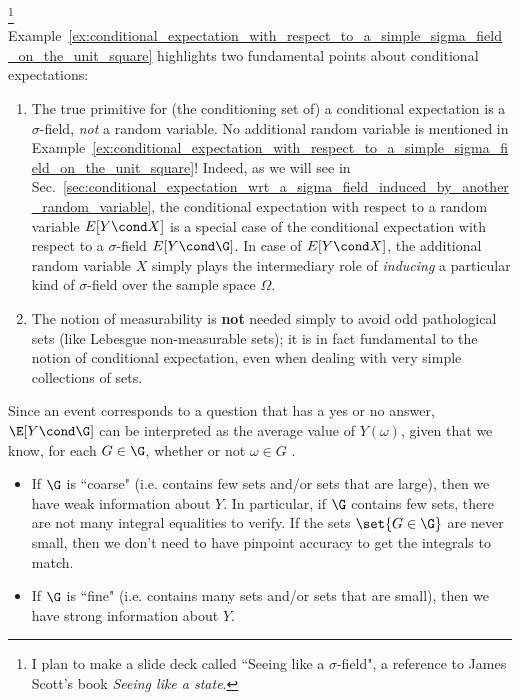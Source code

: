 \documentclass{article} %
\begin{document}
\begin{remark}\footnote{I plan to make a slide deck called ``Seeing like a $\sigma$-field", a reference to James Scott's book \textit{Seeing like a state}.} Example~\ref{ex:conditional_expectation_with_respect_to_a_simple_sigma_field_on_the_unit_square} highlights two fundamental points about conditional expectations:
\begin{enumerate}
\item The true primitive for (the conditioning set of) a conditional expectation is a $\sigma$-field, \textit{not} a random variable.  No additional random variable is mentioned in Example~\ref{ex:conditional_expectation_with_respect_to_a_simple_sigma_field_on_the_unit_square}!  Indeed, as we will see in Sec.~\ref{sec:conditional_expectation_wrt_a_sigma_field_induced_by_another_random_variable}, the conditional expectation with respect to a random variable $E[Y \cond X]$ is a special case of the conditional expectation with respect to a $\sigma$-field $E[Y \cond \G]$.  In case of $E[Y \cond X]$,  the additional random variable $X$ simply plays the intermediary role of \textit{inducing} a particular kind of $\sigma$-field over the sample space $\Omega$. 
\item The notion of measurability is \textbf{not} needed simply to avoid odd pathological sets (like Lebesgue non-measurable sets); it is in fact fundamental to the notion of conditional expectation, even when dealing with very simple collections of sets.
\end{enumerate}	
\end{remark}


\begin{remark}
Since an event corresponds to a question that has a yes or no answer, $\E[Y \cond \G]$ can be interpreted as the average value of $Y(\omega)$, given that we know, for each $G \in \G$, whether or not $\omega \in G$ \cite[pp.218]{ash2000probability}.  
\begin{itemize}
\item If $\G$ is ``coarse" (i.e. contains few sets and/or sets that are large), then  we have weak information about $Y$.  In particular, if $\G$ contains few sets, there are not many integral equalities to verify. If the sets $\set{G \in \G}$ are never small, then we don't need to have pinpoint accuracy to get the integrals to match. 

\item If $\G$ is ``fine" (i.e. contains many sets and/or sets that are small), then we have strong information about $Y$.
\end{itemize}
\label{rk:fineness_of_sigma_field_gives_information_about_a_random_variable}
\end{remark}
\end{document}
